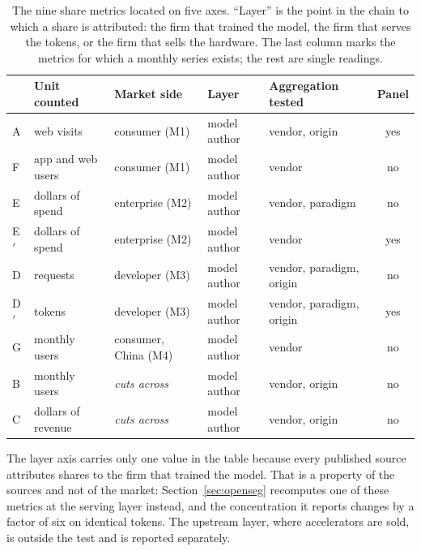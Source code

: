 \documentclass[11pt]{article}
\begin{document}
\begin{table}[h]
\centering\footnotesize
\caption{The nine share metrics located on five axes. ``Layer'' is the point in the chain to which a
share is attributed: the firm that trained the model, the firm that serves the tokens, or the firm that
sells the hardware. The last column marks the metrics for which a monthly series exists; the rest are
single readings.}
\label{tab:taxonomy}
\begin{tabularx}{\textwidth}{@{}l L{2.4cm} L{2.5cm} L{2.2cm} X c@{}}
\toprule
& Unit counted & Market side & Layer & Aggregation tested & Panel \\
\midrule
A  & web visits        & consumer (M1)    & model author & vendor, origin            & yes \\
F  & app and web users & consumer (M1)    & model author & vendor                    & no  \\
\addlinespace
E  & dollars of spend  & enterprise (M2)  & model author & vendor, paradigm          & no  \\
E$'$ & dollars of spend & enterprise (M2) & model author & vendor                    & yes \\
\addlinespace
D  & requests          & developer (M3)   & model author & vendor, paradigm, origin  & no  \\
D$'$ & tokens          & developer (M3)   & model author & vendor, paradigm, origin  & yes \\
\addlinespace
G  & monthly users     & consumer, China (M4) & model author & vendor                & no  \\
\addlinespace
B  & monthly users     & \emph{cuts across}  & model author & vendor, origin         & no  \\
C  & dollars of revenue & \emph{cuts across} & model author & vendor, origin         & no  \\
\bottomrule
\end{tabularx}
\end{table}

\noindent The layer axis carries only one value in the table because every published source attributes
shares to the firm that trained the model. That is a property of the sources and not of the market:
Section~\ref{sec:openseg} recomputes one of these metrics at the serving layer instead, and the
concentration it reports changes by a factor of six on identical tokens. The upstream layer, where
accelerators are sold, is outside the test and is reported separately.
\end{document}
